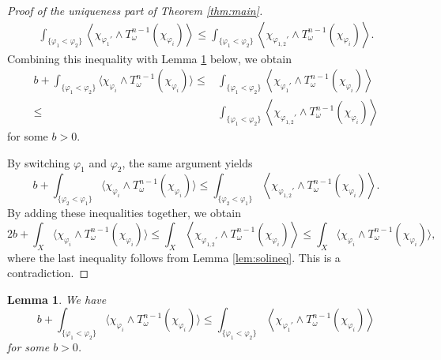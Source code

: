 \documentclass{amsart}
\numberwithin{equation}{section}
\theoremstyle{plain}
\newtheorem{lem}[equation]{Lemma}
\theoremstyle{definition}
\theoremstyle{remark}
\begin{document}
\begin{proof}[Proof of the uniqueness part of Theorem \ref{thm:main}]
    \begin{equation*}
        \begin{split}
            \int_{\{\varphi_1<\varphi_2\}}\left\langle\chi_{\varphi_1'}\wedge T^{n-1}_\omega(\chi_{\varphi_i})\right\rangle
            \le\int_{\{\varphi_1<\varphi_2\}}\left\langle\chi_{\varphi_{1,2}'}\wedge T^{n-1}_\omega(\chi_{\varphi_i})\right\rangle.
        \end{split}
    \end{equation*}
    Combining this inequality with Lemma \ref{lem:BMineq} below, we obtain
    \begin{equation*}
        \begin{aligned}
            b+\int_{\{\varphi_1<\varphi_2\}}\big\langle\chi_{\varphi_i}\wedge T^{n-1}_\omega(\chi_{\varphi_i})\big\rangle
            \le&\int_{\{\varphi_1<\varphi_2\}}\left\langle\chi_{\varphi_1'}\wedge T^{n-1}_\omega(\chi_{\varphi_i})\right\rangle
            \\
            \le&\int_{\{\varphi_1<\varphi_2\}}\left\langle\chi_{\varphi_{1,2}'}\wedge T^{n-1}_\omega(\chi_{\varphi_i})\right\rangle
        \end{aligned}
    \end{equation*}
    for some $b>0$.
    
    By switching $\varphi_1$ and $\varphi_2$, the same argument yields
    $$b+\int_{\{\varphi_2<\varphi_1\}}\big\langle\chi_{\varphi_i}\wedge T^{n-1}_\omega(\chi_{\varphi_i})\big\rangle\le \int_{\{\varphi_2<\varphi_1\}}\left\langle\chi_{\varphi_{1,2}'}\wedge T^{n-1}_\omega(\chi_{\varphi_i})\right\rangle.$$
    By adding these inequalities together, we obtain
    $$2b+\int_X\big\langle\chi_{\varphi_i}\wedge T^{n-1}_\omega(\chi_{\varphi_i})\big\rangle\le \int_X\left\langle\chi_{\varphi_{1,2}'}\wedge T^{n-1}_\omega(\chi_{\varphi_i})\right\rangle\le\int_X\big\langle\chi_{\varphi_i}\wedge T^{n-1}_\omega(\chi_{\varphi_i})\big\rangle,$$
    where the last inequality follows from Lemma \ref{lem:solineq}. This is a contradiction.
\end{proof}

\begin{lem}\label{lem:BMineq}
    We have
    $$b+\int_{\{\varphi_1<\varphi_2\}}\big\langle\chi_{\varphi_i}\wedge T^{n-1}_\omega(\chi_{\varphi_i})\big\rangle\le \int_{\{\varphi_1<\varphi_2\}}\left\langle\chi_{\varphi_1'}\wedge T^{n-1}_\omega(\chi_{\varphi_i})\right\rangle$$
    for some $b>0$.
\end{lem}
\end{document}
